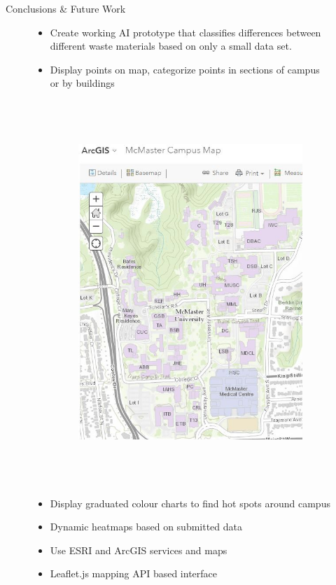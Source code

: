 \documentclass[22pt]{beamer}
\begin{document}
\begin{frame}[fragile]
\begin{textblock}{3.5}
\begin{block}{Conclusions \& Future Work}
\begin{figure}[htbp] %
\begin{itemize}
\item Create working AI prototype that classifies differences between different waste materials based on only a small data set.
\item Display points on map, categorize points in sections of campus or by buildings
\begin{figure}
   \centering
   \includegraphics[height=14.5cm]{pinpointr-map.jpg}
   \label{fig:map}
\end{figure}
\item Display graduated colour charts to find hot spots around campus
\item Dynamic heatmaps based on submitted data 
\item Use ESRI and ArcGIS services and maps 
\item Leaflet.js mapping API based interface
\end{itemize}
\end{figure}
\end{block}


\end{textblock}
\end{frame}
\end{document}
